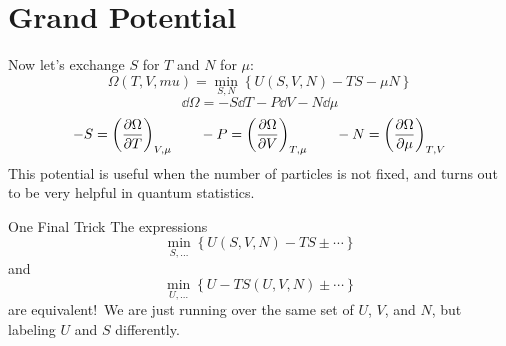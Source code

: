 \documentclass[a4paper,twoside,master.tex]{subfiles}
\begin{document}
\section{Grand Potential}
\label{sec:grand_potential}

Now let's exchange $ S $ for $ T $ and $ N $ for $ \mu $:
\begin{equation}\label{eq:grand_potential}
    \Omega(T,V,mu) = \min_{S,N} \left\{ U(S,V,N) - TS - \mu N \right\}\tag{Grand Potential}
\end{equation}
\begin{equation}
    \dd{\Omega} = - S \dd{T} - P \dd{V} - N \dd{\mu}
\end{equation}
\begin{equation}
    -S = \left( \pdv{\Omega}{T} \right)_{V, \mu} \qquad -P = \left( \pdv{\Omega}{V} \right)_{T, \mu} \qquad -N = \left( \pdv{\Omega}{\mu} \right)_{T,V}
\end{equation}
This potential is useful when the number of particles is not fixed, and turns out to be very helpful in quantum statistics.

\begin{note}{One Final Trick}
    The expressions
    \begin{equation}
        \min_{S,\ldots} \left\{ U(S,V,N) - TS \pm \cdots \right\}
    \end{equation}
    and
    \begin{equation}
        \min_{U,\ldots} \left\{ U - TS(U,V,N) \pm \cdots \right\}
    \end{equation}
    are equivalent!\ We are just running over the same set of $ U $, $ V $, and $ N $, but labeling $ U $ and $ S $ differently.
\end{note}
\end{document}
